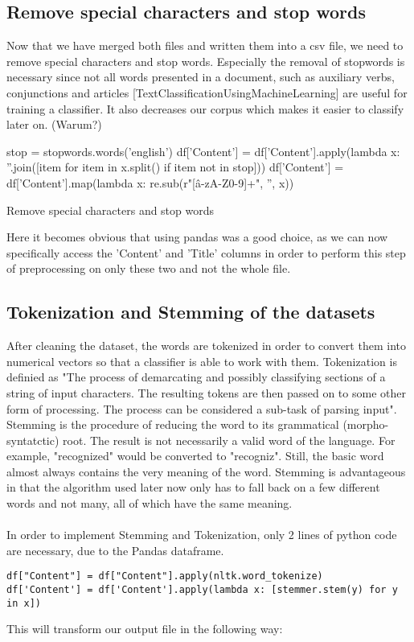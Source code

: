 \documentclass[a4paper, 11pt,titlepage,oneside,openany]{book}
\begin{document}
\subsection{Remove special characters and stop words}
Now that we have merged both files and written them into a csv file, we need to remove special characters and stop words. Especially the removal of stopwords is necessary since not all words presented in a document, such as auxiliary verbs, conjunctions and articles [TextClassificationUsingMachineLearning] are useful for training a classifier. It also decreases our corpus which makes it easier to classify later on. (Warum?)\\
\noindent
\begin{algorithm}[H]
		\DontPrintSemicolon
	stop = stopwords.words('english')\;
	\BlankLine
	\BlankLine
	df['Content'] = df['Content'].apply(lambda x: ''.join([item for item in x.split() if item not in stop]))\;
	df['Content'] = df['Content'].map(lambda x: re.sub(r"[\^ a-zA-Z0-9]+", '', x))\;
	\caption{Remove special characters and stop words}
\end{algorithm}
\noindent Here it becomes obvious that using pandas was a good choice, as we can now specifically access the 'Content' and 'Title' columns in order to perform this step of preprocessing on only these two and not the whole file.


\subsection{Tokenization and Stemming of the datasets}
After cleaning the dataset, the words are tokenized in order to convert them into numerical vectors so that a classifier is able to work with them. Tokenization is definied as "The process of demarcating and possibly classifying sections of a string of input characters. The resulting tokens are then passed on to some other form of processing. The process can be considered a sub-task of parsing input".\\
\noindent Stemming is the procedure of reducing the word to its grammatical (morpho-syntatctic) root. The result is not necessarily a valid word of the language. For example, "recognized" would be converted to "recogniz". Still, the basic word almost always contains the very meaning of the word. Stemming is advantageous in that the algorithm used later now only has to fall back on a few different words and not many, all of which have the same meaning.\\
\\
\noindent In order to implement Stemming and Tokenization, only 2 lines of python code are necessary, due to the Pandas dataframe. \\
\noindent
\begin{minipage}{\linewidth}
\begin{lstlisting}[frame=single]
df["Content"] = df["Content"].apply(nltk.word_tokenize)
df['Content'] = df['Content'].apply(lambda x: [stemmer.stem(y) for y in x])
\end{lstlisting}
\end{minipage}
This will transform our output file in the following way:
\end{document}
